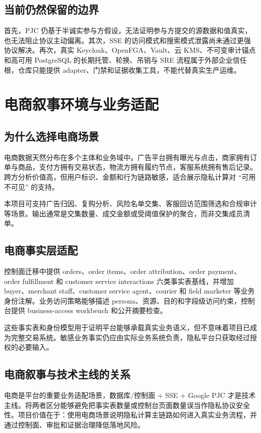 \documentclass[UTF8,a4paper,12pt,oneside]{ctexrep}
\begin{document}
\section{当前仍然保留的边界}

首先，PJC 仍基于半诚实参与方假设，无法证明参与方提交的源数据和值真实，也无法阻止协议主动偏离。其次，SSE 的访问模式和搜索模式泄露尚未通过更强协议解决。再次，真实 Keycloak、OpenFGA、Vault、云 KMS、不可变审计锚点和高可用 PostgreSQL 的长期托管、轮换、吊销与 SRE 流程属于外部企业信任根，仓库只能提供 adapter、门禁和证据收集工具，不能代替真实生产运维。

\chapter{电商叙事环境与业务适配}

\section{为什么选择电商场景}

电商数据天然分布在多个主体和业务域中。广告平台拥有曝光与点击，商家拥有订单与商品，支付方拥有交易状态，物流方拥有履约节点，客服系统拥有售后记录。跨方分析价值高，但用户标识、金额和行为链路敏感，适合展示隐私计算对 ``可用不可见'' 的支持。

本项目可支持广告归因、复购分析、风险名单交集、客服回访范围筛选和合规审计等场景。输出通常是交集数量、成交金额或受阈值保护的聚合，而非交集成员清单。

\section{电商事实层适配}

控制面迁移中提供 orders、order items、order attribution、order payment、order fulfillment 和 customer service interactions 六类事实表基线，并增加 buyer、merchant staff、customer service agent、courier 和 field marketer 等业务身份注解。业务访问策略能够描述 persona、资源、目的和字段级访问约束，控制台提供 business-access workbench 和公开摘要检查。

这些事实表和身份模型用于证明平台能够承载真实业务语义，但不意味着项目已成为完整交易系统。敏感业务事实仍应由实际业务系统负责，隐私平台只获取经过授权的必要输入。

\section{电商叙事与技术主线的关系}

电商是平台的重要业务适配场景，数据库/控制面 + SSE + Google PJC 才是技术主线。将两者区分能够避免把事实表数量或控制台页面数量误当作隐私协议安全性。项目价值在于：使用电商场景说明隐私计算主链路如何进入真实业务流程，并通过控制面、审批和证据治理降低落地风险。
\end{document}
